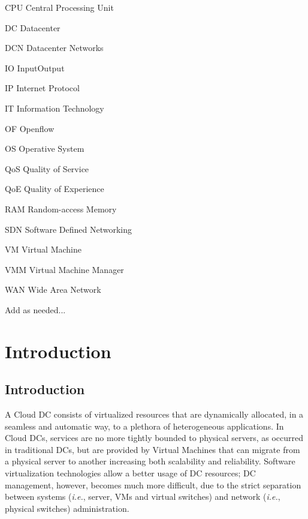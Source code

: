 \documentclass[12pt,english,oneside]{book}
\newenvironment{lyxlist}[1]
   {\begin{list}{}
     {\settowidth{\labelwidth}{#1}
      \setlength{\leftmargin}{\labelwidth}
      \addtolength{\leftmargin}{\labelsep}
      \renewcommand{\makelabel}[1]{##1\hfil}}}
   {\end{list}}
\begin{document}


\begin{lyxlist}{00.00.0000}
\begin{singlespace}
\item [CPU]Central Processing Unit
\item [DC]Datacenter
\item [DCN]Datacenter Networks
\item [IO]Input\/Output
\item [IP]Internet Protocol 
\item [IT]Information Technology
\item [OF]Openflow
\item [OS]Operative System
\item [QoS] Quality of Service
\item [QoE] Quality of Experience
\item [RAM]Random-access Memory
\item [SDN]Software Defined Networking
\item [VM]Virtual Machine
\item [VMM]Virtual Machine Manager
\item [WAN] Wide Area Network
\item Add as needed...
\end{singlespace}
\end{lyxlist}


\listoffigures


\listoftables


\setcounter{page}{0}



\chapter{Introduction\label{cha:introduction}}

\section{Introduction}
\hspace{0.6cm}

A Cloud DC consists of virtualized resources that are dynamically allocated, in a seamless and automatic way, to a plethora of heterogeneous applications.
In Cloud DCs, services are no more tightly bounded to physical servers, as occurred in traditional DCs, but are provided by Virtual Machines that can migrate from a physical server to another increasing both scalability and reliability.
Software virtualization technologies allow a better usage of DC resources; DC management, however, becomes much more difficult, due to the strict separation between systems (\textit{i.e.}, server, VMs and virtual switches) and network (\textit{i.e.}, physical switches) administration.
\end{document}

